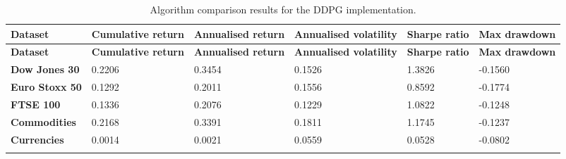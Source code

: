 \begin{longtable}{|l|p{2.1cm}|p{2.1cm}|p{2.1cm}|p{1.5cm}|p{2cm}|}
    \hline
    \textbf{Dataset} & \textbf{Cumulative return} & \textbf{Annualised return} & \textbf{Annualised volatility} & \textbf{Sharpe ratio} & \textbf{Max drawdown}  \\ \midrule
    \endfirsthead

    \hline
    \textbf{Dataset} & \textbf{Cumulative return} & \textbf{Annualised return} & \textbf{Annualised volatility} & \textbf{Sharpe ratio} & \textbf{Max drawdown}  \\ \midrule
    \endhead

    \endfoot
    \hline

    \textbf{Dow Jones 30} & 0.2206 & 0.3454 & 0.1526 & 1.3826 & -0.1560 \\ \hline
    \textbf{Euro Stoxx 50} & 0.1292 & 0.2011 & 0.1556 & 0.8592 & -0.1774 \\ \hline
    \textbf{FTSE 100} & 0.1336 & 0.2076 & 0.1229 & 1.0822 & -0.1248 \\ \hline
    \textbf{Commodities} & 0.2168 & 0.3391 & 0.1811 & 1.1745 & -0.1237 \\ \hline
    \textbf{Currencies} & 0.0014 & 0.0021 & 0.0559 & 0.0528 & -0.0802 \\ \hline

    \caption{Algorithm comparison results for the DDPG implementation.}
    \label{tab:experiment_algorithms_ddpg}
\end{longtable}